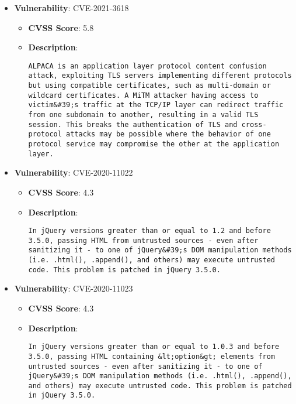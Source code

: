 \documentclass{article}
\begin{document}
\begin{itemize}
        \item \textbf{Vulnerability}: CVE-2021-3618
        \begin{itemize}
            \item \textbf{CVSS Score}:  5.8 
            \item \textbf{Description}:
            \parbox[t]{0.9\linewidth}{
                \verb|ALPACA is an application layer protocol content confusion attack, exploiting TLS servers implementing different protocols but using compatible certificates, such as multi-domain or wildcard certificates. A MiTM attacker having access to victim&#39;s traffic at the TCP/IP layer can redirect traffic from one subdomain to another, resulting in a valid TLS session. This breaks the authentication of TLS and cross-protocol attacks may be possible where the behavior of one protocol service may compromise the other at the application layer.|
            }
        \end{itemize}
    
        \item \textbf{Vulnerability}: CVE-2020-11022
        \begin{itemize}
            \item \textbf{CVSS Score}:  4.3 
            \item \textbf{Description}:
            \parbox[t]{0.9\linewidth}{
                \verb|In jQuery versions greater than or equal to 1.2 and before 3.5.0, passing HTML from untrusted sources - even after sanitizing it - to one of jQuery&#39;s DOM manipulation methods (i.e. .html(), .append(), and others) may execute untrusted code. This problem is patched in jQuery 3.5.0.|
            }
        \end{itemize}
    
        \item \textbf{Vulnerability}: CVE-2020-11023
        \begin{itemize}
            \item \textbf{CVSS Score}:  4.3 
            \item \textbf{Description}:
            \parbox[t]{0.9\linewidth}{
                \verb|In jQuery versions greater than or equal to 1.0.3 and before 3.5.0, passing HTML containing &lt;option&gt; elements from untrusted sources - even after sanitizing it - to one of jQuery&#39;s DOM manipulation methods (i.e. .html(), .append(), and others) may execute untrusted code. This problem is patched in jQuery 3.5.0.|
            }
        \end{itemize}
    
\end{itemize}
\end{document}
